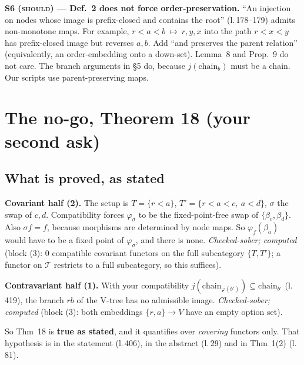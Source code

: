 \documentclass[11pt]{article}
\newcommand{\iss}[1]{\textsc{#1}}
\newcommand{\T}{\mathcal T}
\begin{document}
\textbf{S6 (\iss{should}) --- Def.~2 does not force order-preservation.} ``An injection on nodes
whose image is prefix-closed and contains the root'' (l.\,178--179) admits non-monotone maps. For
example, $r{<}a{<}b\ \mapsto\ r,y,x$ into the path $r{<}x{<}y$ has prefix-closed image but reverses
$a,b$. Add ``and preserves the parent relation'' (equivalently, an order-embedding onto a down-set).
Lemma~8 and Prop.~9 do not care. The branch arguments in \S5 do, because $j(\mathrm{chain}_b)$ must
be a chain. Our scripts use parent-preserving maps.

\section{The no-go, Theorem 18 (your second ask)}
\subsection{What is proved, as stated}
\textbf{Covariant half (2).} The setup is $T=\{r<a\}$, $T'=\{r<a<c,\ a<d\}$, $\sigma$ the swap of
$c,d$. Compatibility forces $\varphi_\sigma$ to be the fixed-point-free swap of $\{\beta_c,\beta_d\}$.
Also $\sigma f=f$, because morphisms are determined by node maps. So $\varphi_f(\beta_a)$ would have
to be a fixed point of $\varphi_\sigma$, and there is none. \emph{Checked-sober; computed} (block (3):
0 compatible covariant functors on the full subcategory $\{T,T'\}$; a functor on $\T$ restricts to a
full subcategory, so this suffices).

\textbf{Contravariant half (1).} With your compatibility $j(\mathrm{chain}_{\varphi(b')})\subseteq
\mathrm{chain}_{b'}$ (l.\,419), the branch $rb$ of the V-tree has no admissible image. \emph{Checked-sober;
computed} (block (3): both embeddings $\{r,a\}\to V$ have an empty option set).

So Thm~18 is \textbf{true as stated}, and it quantifies over \emph{covering} functors only. That
hypothesis is in the statement (l.\,406), in the abstract (l.\,29) and in Thm~1(2) (l.\,81).
\end{document}
